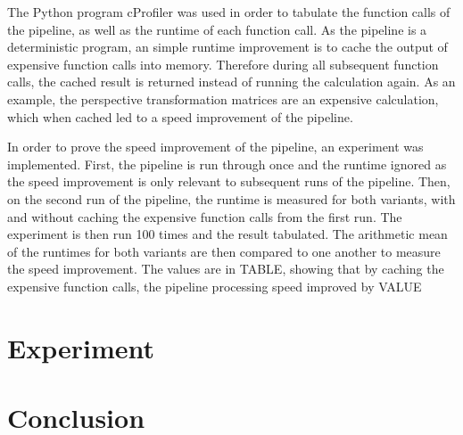 \documentclass[arbeit=studie,oneside,BCOR=12mm]{ArbeitRST}
\begin{document}
The Python program cProfiler was used in order to tabulate the function calls of
the pipeline, as well as the runtime of each function call. As the pipeline is a
deterministic program, an simple runtime improvement is to cache the output of 
expensive function calls into memory. Therefore during all subsequent function 
calls, the cached result is returned instead of running the calculation again. 
As an example, the perspective transformation matrices are an expensive 
calculation, which when cached led to a speed improvement of the pipeline.

In order to prove the speed improvement of the pipeline, an experiment was 
implemented. First, the pipeline is run through once and the runtime ignored as
the speed improvement is only relevant to subsequent runs of the pipeline. Then,
on the second run of the pipeline, the runtime is measured for both variants, 
with and without caching the expensive function calls from the first run. The 
experiment is then run 100 times and the result tabulated. The arithmetic mean 
of the runtimes for both variants are then compared to one another to measure 
the speed improvement. The values are in TABLE, showing that by caching the 
expensive function calls, the pipeline processing speed improved by VALUE%

\chapter{Experiment}
\chapter{Conclusion}
\end{document}
